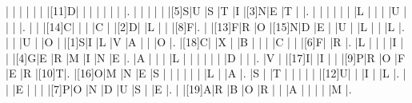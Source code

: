 \documentclass[12pt]{article}
\begin{document}
\begin{Puzzle}{15}{15}
  |{}  |{}  |{}  |{}  |{}  |{}  |[11]D|{}  |{}  |{}  |{}  |{}  |{}  |{}  |.
  |{}  |{}  |{}  |{}  |{}  |[5]S|U   |S   |T   |I   |[3]N|E   |T   |{}  |.
  |{}  |{}  |{}  |{}  |{}  |{}  |L   |{}  |{}  |{}  |U   |{}  |{}  |{}  |.
  |{}  |{}  |[14]C|{}  |{}  |{}  |C   |{}  |[2]D|{}  |L   |{}  |{}  |[8]F|.
  |{}  |[13]F|R   |O   |[15]N|D   |E   |{}  |U   |{}  |L   |{}  |{}  |L   |.
  |{}  |{}  |U   |{}  |O   |{}  |[1]S|I   |L   |V   |A   |{}  |{}  |O   |.
  |[18]C|{}  |X   |{}  |B   |{}  |{}  |{}  |C   |{}  |{}  |[6]F|{}  |R   |.
  |L   |{}  |{}  |{}  |I   |{}  |{}  |[4]G|E   |R   |M   |I   |N   |E   |.
  |A   |{}  |{}  |{}  |L   |{}  |{}  |{}  |{}  |{}  |{}  |D   |{}  |{}  |.
  |V   |{}  |[17]I|{}  |I   |{}  |{}  |[9]P|R   |O   |F   |E   |R   |[10]T|.
  |[16]O|M   |N   |E   |S   |{}  |{}  |{}  |{}  |{}  |{}  |L   |{}  |A   |.
  |S   |{}  |T   |{}  |{}  |{}  |{}  |{}  |[12]U|{}  |{}  |I   |{}  |L   |.
  |{}  |{}  |E   |{}  |{}  |{}  |[7]P|O   |N   |D   |U   |S   |{}  |E   |.
  |{}  |[19]A|R   |B   |O   |R   |{}  |{}  |A   |{}  |{}  |{}  |{}  |M   |.
\end{Puzzle}
\end{document}
